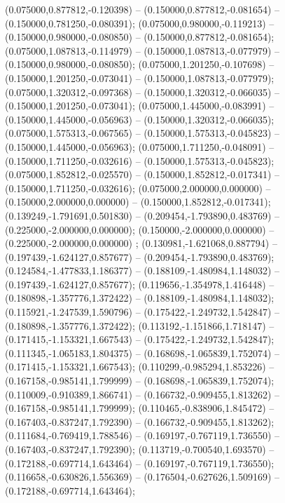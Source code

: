  (0.075000,0.877812,-0.120398) -- (0.150000,0.877812,-0.081654) -- (0.150000,0.781250,-0.080391);
 (0.075000,0.980000,-0.119213) -- (0.150000,0.980000,-0.080850) -- (0.150000,0.877812,-0.081654);
 (0.075000,1.087813,-0.114979) -- (0.150000,1.087813,-0.077979) -- (0.150000,0.980000,-0.080850);
 (0.075000,1.201250,-0.107698) -- (0.150000,1.201250,-0.073041) -- (0.150000,1.087813,-0.077979);
 (0.075000,1.320312,-0.097368) -- (0.150000,1.320312,-0.066035) -- (0.150000,1.201250,-0.073041);
 (0.075000,1.445000,-0.083991) -- (0.150000,1.445000,-0.056963) -- (0.150000,1.320312,-0.066035);
 (0.075000,1.575313,-0.067565) -- (0.150000,1.575313,-0.045823) -- (0.150000,1.445000,-0.056963);
 (0.075000,1.711250,-0.048091) -- (0.150000,1.711250,-0.032616) -- (0.150000,1.575313,-0.045823);
 (0.075000,1.852812,-0.025570) -- (0.150000,1.852812,-0.017341) -- (0.150000,1.711250,-0.032616);
 (0.075000,2.000000,0.000000) -- (0.150000,2.000000,0.000000) -- (0.150000,1.852812,-0.017341);
 (0.139249,-1.791691,0.501830) -- (0.209454,-1.793890,0.483769) -- (0.225000,-2.000000,0.000000);
 (0.150000,-2.000000,0.000000) -- (0.225000,-2.000000,0.000000) ;
 (0.130981,-1.621068,0.887794) -- (0.197439,-1.624127,0.857677) -- (0.209454,-1.793890,0.483769);
 (0.124584,-1.477833,1.186377) -- (0.188109,-1.480984,1.148032) -- (0.197439,-1.624127,0.857677);
 (0.119656,-1.354978,1.416448) -- (0.180898,-1.357776,1.372422) -- (0.188109,-1.480984,1.148032);
 (0.115921,-1.247539,1.590796) -- (0.175422,-1.249732,1.542847) -- (0.180898,-1.357776,1.372422);
 (0.113192,-1.151866,1.718147) -- (0.171415,-1.153321,1.667543) -- (0.175422,-1.249732,1.542847);
 (0.111345,-1.065183,1.804375) -- (0.168698,-1.065839,1.752074) -- (0.171415,-1.153321,1.667543);
 (0.110299,-0.985294,1.853226) -- (0.167158,-0.985141,1.799999) -- (0.168698,-1.065839,1.752074);
 (0.110009,-0.910389,1.866741) -- (0.166732,-0.909455,1.813262) -- (0.167158,-0.985141,1.799999);
 (0.110465,-0.838906,1.845472) -- (0.167403,-0.837247,1.792390) -- (0.166732,-0.909455,1.813262);
 (0.111684,-0.769419,1.788546) -- (0.169197,-0.767119,1.736550) -- (0.167403,-0.837247,1.792390);
 (0.113719,-0.700540,1.693570) -- (0.172188,-0.697714,1.643464) -- (0.169197,-0.767119,1.736550);
 (0.116658,-0.630826,1.556369) -- (0.176504,-0.627626,1.509169) -- (0.172188,-0.697714,1.643464);
